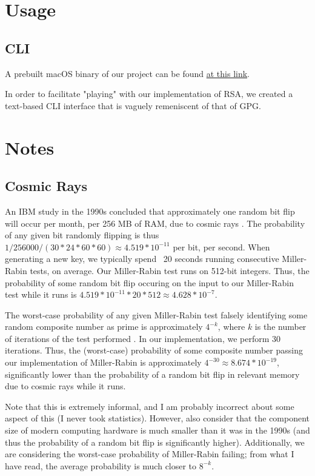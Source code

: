 \documentclass{article}
\begin{document}
\section{Usage}
\subsection{CLI}
A prebuilt macOS binary of our project can be found \href{https://github.com/DarthGeek01/rust-rsa-vis/releases/tag/v0.0}{at this link}.

In order to facilitate "playing" with our implementation of RSA, we created a text-based CLI interface that is vaguely remeniscent of that of GPG. 


\section{Notes}
\subsection{Cosmic Rays}
\label{sec:rays}
An IBM study in the 1990s concluded that approximately one random bit flip will occur per month, per 256 MB of RAM, due to cosmic rays \cite{cosmic}. The probability of any given bit randomly flipping is thus $1 / 256000 / (30 * 24 * 60 * 60) \approx 4.519 * 10^{-11}$ per bit, per second. When generating a new key, we typically spend ~20 seconds running consecutive Miller-Rabin tests, on average. Our Miller-Rabin test runs on 512-bit integers. Thus, the probability of some random bit flip occuring on the input to our Miller-Rabin test while it runs is $4.519 * 10^{-11} * 20 * 512 \approx 4.628 * 10^{-7}$.

The worst-case probability of any given Miller-Rabin test falsely identifying some random composite number as prime is approximately $4^{-k }$, where $k$ is the number of iterations of the test performed \cite{wolfram}. In our implementation, we perform 30 iterations. Thus, the (worst-case) probability of some composite number passing our implementation of Miller-Rabin is approximately $4^{-30} \approx 8.674 * 10^{-19}$, significantly lower than the probability of a random bit flip in relevant memory due to cosmic rays while it runs.

Note that this is extremely informal, and I am probably incorrect about some aspect of this (I never took statistics). However, also consider that the component size of modern computing hardware is much smaller than it was in the 1990s (and thus the probability of a random bit flip is significantly higher). Additionally, we are considering the worst-case probability of Miller-Rabin failing; from what I have read, the average probability is much closer to $8^{-k}$.
\end{document}
